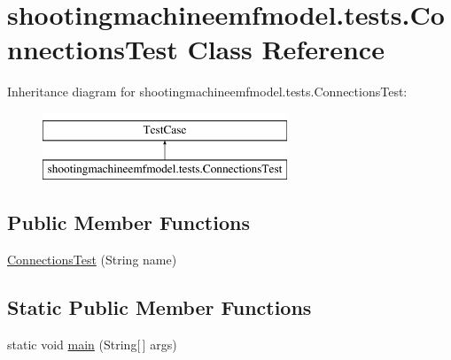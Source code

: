 \hypertarget{classshootingmachineemfmodel_1_1tests_1_1_connections_test}{\section{shootingmachineemfmodel.\-tests.\-Connections\-Test Class Reference}
\label{classshootingmachineemfmodel_1_1tests_1_1_connections_test}
}
Inheritance diagram for shootingmachineemfmodel.\-tests.\-Connections\-Test\-:\begin{figure}[H]
\begin{center}
\leavevmode
\includegraphics[height=2.000000cm]{classshootingmachineemfmodel_1_1tests_1_1_connections_test}
\end{center}
\end{figure}
\subsection*{Public Member Functions}
\begin{DoxyCompactItemize}
\item 
\hyperlink{classshootingmachineemfmodel_1_1tests_1_1_connections_test_aa29c9b2f428b8e0150115badafab372e}{Connections\-Test} (String name)
\end{DoxyCompactItemize}
\subsection*{Static Public Member Functions}
\begin{DoxyCompactItemize}
\item 
static void \hyperlink{classshootingmachineemfmodel_1_1tests_1_1_connections_test_a44aff6efbe3a6808754fdd6ac8f9965c}{main} (String\mbox{[}$\,$\mbox{]} args)
\end{DoxyCompactItemize}
